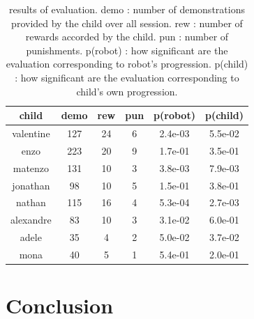 \documentclass{sig-alternate}
\begin{document}
\begin{table}
    \centering
    \begin{tabular}{|c|c|c|c|c|c|}
        \hline
        child & demo & rew & pun & p(robot) & p(child)\\ \hline
        valentine & 127 & 24 & 6 & 2.4e-03 & 5.5e-02\\ \hline
        enzo & 223 & 20 & 9 & 1.7e-01 & 3.5e-01\\ \hline
        matenzo & 131 & 10 & 3 & 3.8e-03 & 7.9e-03\\ \hline
        jonathan & 98 & 10 & 5 &  1.5e-01 & 3.8e-01\\ \hline
        nathan & 115 & 16 & 4 & 5.3e-04 & 2.7e-03\\ \hline
        alexandre & 83 & 10 & 3 & 3.1e-02 & 6.0e-01\\ \hline
        adele & 35 & 4 & 2 & 5.0e-02 & 3.7e-02\\ \hline
        mona & 40 & 5 & 1 &  5.4e-01 & 2.0e-01\\ \hline
    \end{tabular}
    \caption{results of evaluation. demo : number of demonstrations provided by
        the child over all session. rew : number of rewards accorded by
        the child. pun : number of punishments. p(robot) : how
        significant are the evaluation corresponding to robot's progression. p(child) : how significant are the evaluation corresponding to child's own progression.}
    \label{table:scores}
\end{table}


\section{Conclusion}



 
\end{document}
